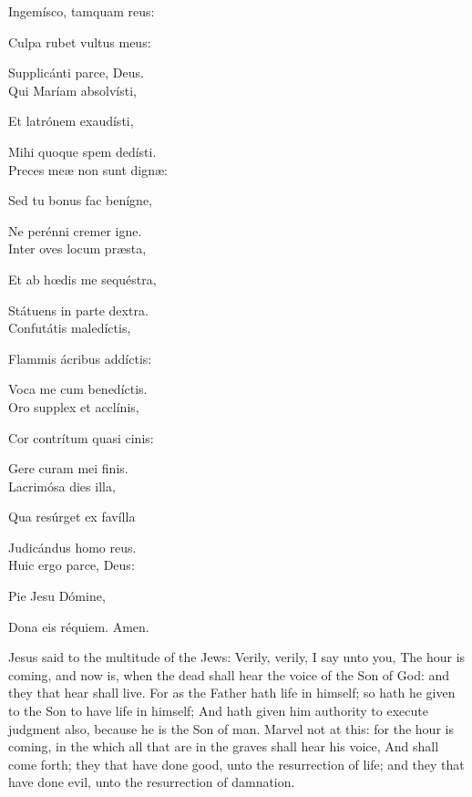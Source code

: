 {Ingemísco, tamquam reus:

Culpa rubet vultus meus:

Supplicánti parce, Deus.\\

Qui Maríam absolvísti,

Et latrónem exaudísti,

Mihi quoque spem dedísti.\\

Preces me{\ae} non sunt dign{\ae}:

Sed tu bonus fac benígne,

Ne perénni cremer igne.\\

Inter oves locum pr{\ae}sta,

Et ab h{\oe}dis me sequéstra,

Státuens in parte dextra.\\

Confutátis maledíctis,

Flammis ácribus addíctis:

Voca me cum benedíctis.\\

Oro supplex et acclínis,

Cor contrítum quasi cinis:

Gere curam mei finis.\\

Lacrimósa dies illa,

Qua resúrget ex favílla

Judicándus homo reus.\\

Huic ergo parce, Deus:

Pie Jesu Dómine,

Dona eis réquiem. Amen.}
 Jesus said to the multitude of the Jews: Verily, verily, I say unto you, The hour is coming, and now is, when the dead shall hear the voice of the Son of God: and they that hear shall live. For as the Father hath life in himself; so hath he given to the Son to have life in himself; And hath given him authority to execute judgment also, because he is the Son of man. Marvel not at this: for the hour is coming, in the which all that are in the graves shall hear his voice, And shall come forth; they that have done good, unto the resurrection of life; and they that have done evil, unto the resurrection of damnation.
